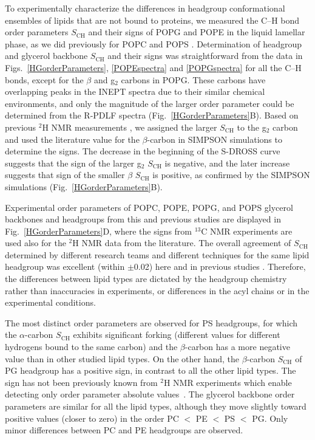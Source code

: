 \documentclass[journal=jpcbfk,manuscript=article]{achemso}
\begin{document}
To experimentally characterize the differences in headgroup conformational ensembles of lipids that are not
bound to proteins, we measured the C--H bond order parameters $S_\mathrm{CH}$
and their signs of POPG and POPE in the liquid lamellar phase, as we did previously for POPC and POPS \cite{ferreira13,ferreira16,antila19}.
Determination of headgroup and glycerol backbone $S_\mathrm{CH}$ and their signs
was straightforward from the data in Figs.~\ref{HGorderParameters}, \ref{POPEspectra} and \ref{POPGspectra}
for all the C--H bonds, except for the $\beta$ and g$_2$ carbons in POPG.
These carbons have overlapping peaks in the INEPT spectra due to their similar chemical environments,
and only the magnitude of the larger order parameter could be determined from the R-PDLF spectra (Fig.~\ref{HGorderParameters}B).
Based on previous $^2$H NMR measurements \cite{wohlgemuth80,gally81,borle85},
we assigned the larger $S_\mathrm{CH}$ to the g$_2$ carbon
and used the literature value for the $\beta$-carbon in SIMPSON simulations to determine the signs.
The decrease in the beginning of the S-DROSS curve suggests that the sign of the larger g$_2$ $S_\mathrm{CH}$
is negative, and the later increase suggests that sign of the smaller $\beta$ $S_\mathrm{CH}$ is positive, as confirmed by the SIMPSON simulations (Fig.~\ref{HGorderParameters}B).

Experimental order parameters of POPC, POPE, POPG, and POPS glycerol backbones and headgroups from this and previous studies are displayed in Fig.~\ref{HGorderParameters}D, where the signs from $^{13}$C NMR experiments are used also for the $^2$H NMR data from the literature. The overall agreement of $S_\mathrm{CH}$ determined by different research teams and different techniques for the same lipid headgroup was excellent (within $\pm$0.02) here and in previous studies \cite{botan15,ollila16,antila19}. Therefore, the differences between lipid types are dictated by the headgroup chemistry rather than inaccuracies in experiments, or differences in the acyl chains or in the experimental conditions.


The most distinct order parameters are observed for PS headgroups, for which the $\alpha$-carbon $S_\mathrm{CH}$ exhibits significant forking (different values for different hydrogens bound to the same carbon) and the $\beta$-carbon has a more negative value than in other studied lipid types. On the other hand, the $\beta$-carbon $S_\mathrm{CH}$ of PG headgroup has a positive sign, in contrast to all the other lipid types. The sign has not been previously known from $^2$H NMR experiments which enable detecting only order parameter absolute values~\cite{wohlgemuth80,gally81,borle85}. The glycerol backbone order parameters are similar for all the lipid types, although they move slightly toward positive values (closer to zero) in the order PC $<$ PE $<$ PS $<$ PG. Only minor differences between PC and PE headgroups are observed.
\end{document}
